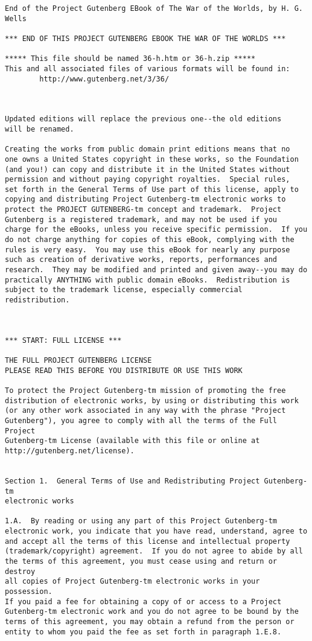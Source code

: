 \begin{Verbatim}[fontsize=\footnotesize]
End of the Project Gutenberg EBook of The War of the Worlds, by H. G. Wells

*** END OF THIS PROJECT GUTENBERG EBOOK THE WAR OF THE WORLDS ***

***** This file should be named 36-h.htm or 36-h.zip *****
This and all associated files of various formats will be found in:
        http://www.gutenberg.net/3/36/



Updated editions will replace the previous one--the old editions
will be renamed.

Creating the works from public domain print editions means that no
one owns a United States copyright in these works, so the Foundation
(and you!) can copy and distribute it in the United States without
permission and without paying copyright royalties.  Special rules,
set forth in the General Terms of Use part of this license, apply to
copying and distributing Project Gutenberg-tm electronic works to
protect the PROJECT GUTENBERG-tm concept and trademark.  Project
Gutenberg is a registered trademark, and may not be used if you
charge for the eBooks, unless you receive specific permission.  If you
do not charge anything for copies of this eBook, complying with the
rules is very easy.  You may use this eBook for nearly any purpose
such as creation of derivative works, reports, performances and
research.  They may be modified and printed and given away--you may do
practically ANYTHING with public domain eBooks.  Redistribution is
subject to the trademark license, especially commercial
redistribution.



*** START: FULL LICENSE ***

THE FULL PROJECT GUTENBERG LICENSE
PLEASE READ THIS BEFORE YOU DISTRIBUTE OR USE THIS WORK

To protect the Project Gutenberg-tm mission of promoting the free
distribution of electronic works, by using or distributing this work
(or any other work associated in any way with the phrase "Project
Gutenberg"), you agree to comply with all the terms of the Full Project
Gutenberg-tm License (available with this file or online at
http://gutenberg.net/license).


Section 1.  General Terms of Use and Redistributing Project Gutenberg-tm
electronic works

1.A.  By reading or using any part of this Project Gutenberg-tm
electronic work, you indicate that you have read, understand, agree to
and accept all the terms of this license and intellectual property
(trademark/copyright) agreement.  If you do not agree to abide by all
the terms of this agreement, you must cease using and return or destroy
all copies of Project Gutenberg-tm electronic works in your possession.
If you paid a fee for obtaining a copy of or access to a Project
Gutenberg-tm electronic work and you do not agree to be bound by the
terms of this agreement, you may obtain a refund from the person or
entity to whom you paid the fee as set forth in paragraph 1.E.8.


\end{Verbatim}
